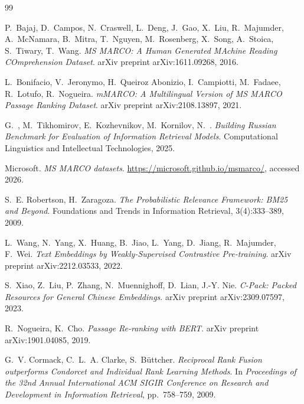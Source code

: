 \documentclass[runningheads,a4paper]{llncs}
\begin{document}
\begin{thebibliography}{99}

P.~Bajaj, D.~Campos, N.~Craswell, L.~Deng, J.~Gao, X.~Liu, R.~Majumder, A.~McNamara, B.~Mitra, T.~Nguyen, M.~Rosenberg, X.~Song, A.~Stoica, S.~Tiwary, T.~Wang.
\newblock \textit{MS MARCO: A Human Generated MAchine Reading COmprehension Dataset}.
\newblock arXiv preprint arXiv:1611.09268, 2016.

L.~Bonifacio, V.~Jeronymo, H.~Queiroz Abonizio, I.~Campiotti, M.~Fadaee, R.~Lotufo, R.~Nogueira.
\newblock \textit{mMARCO: A Multilingual Version of MS MARCO Passage Ranking Dataset}.
\newblock arXiv preprint arXiv:2108.13897, 2021.

G.~, M.~Tikhomirov, E.~Kozhevnikov, M.~Kornilov, N.~.
\newblock \textit{Building Russian Benchmark for Evaluation of Information Retrieval Models}.
\newblock Computational Linguistics and Intellectual Technologies, 2025.



Microsoft.
\newblock \textit{MS MARCO datasets}.
\newblock \url{https://microsoft.github.io/msmarco/}, accessed 2026.

S.~E. Robertson, H.~Zaragoza.
\newblock \textit{The Probabilistic Relevance Framework: BM25 and Beyond}.
\newblock Foundations and Trends in Information Retrieval, 3(4):333--389, 2009.

L.~Wang, N.~Yang, X.~Huang, B.~Jiao, L.~Yang, D.~Jiang, R.~Majumder, F.~Wei.
\newblock \textit{Text Embeddings by Weakly-Supervised Contrastive Pre-training}.
\newblock arXiv preprint arXiv:2212.03533, 2022.

S.~Xiao, Z.~Liu, P.~Zhang, N.~Muennighoff, D.~Lian, J.-Y. Nie.
\newblock \textit{C-Pack: Packed Resources for General Chinese Embeddings}.
\newblock arXiv preprint arXiv:2309.07597, 2023.

R.~Nogueira, K.~Cho.
\newblock \textit{Passage Re-ranking with BERT}.
\newblock arXiv preprint arXiv:1901.04085, 2019.

G.~V. Cormack, C.~L.~A. Clarke, S.~B{\"u}ttcher.
\newblock \textit{Reciprocal Rank Fusion outperforms Condorcet and Individual Rank Learning Methods}.
\newblock In \textit{Proceedings of the 32nd Annual International ACM SIGIR Conference on Research and Development in Information Retrieval}, pp.~758--759, 2009.


\end{thebibliography}
\end{document}
